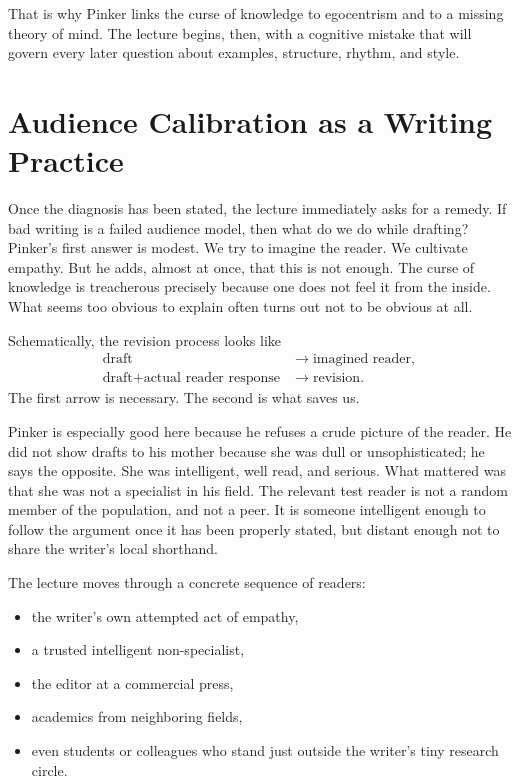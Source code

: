That is why Pinker links the curse of knowledge to egocentrism and to a missing theory of mind. The lecture begins, then, with a cognitive mistake that will govern every later question about examples, structure, rhythm, and style.

\section{Audience Calibration as a Writing Practice}

Once the diagnosis has been stated, the lecture immediately asks for a remedy. If bad writing is a failed audience model, then what do we do while drafting? Pinker's first answer is modest. We try to imagine the reader. We cultivate empathy. But he adds, almost at once, that this is not enough. The curse of knowledge is treacherous precisely because one does not feel it from the inside. What seems too obvious to explain often turns out not to be obvious at all.

Schematically, the revision process looks like
\begin{align}
\text{draft} &\to \text{imagined reader}, \\
\text{draft} + \text{actual reader response} &\to \text{revision}.
\end{align}
The first arrow is necessary. The second is what saves us.

Pinker is especially good here because he refuses a crude picture of the reader. He did not show drafts to his mother because she was dull or unsophisticated; he says the opposite. She was intelligent, well read, and serious. What mattered was that she was not a specialist in his field. The relevant test reader is not a random member of the population, and not a peer. It is someone intelligent enough to follow the argument once it has been properly stated, but distant enough not to share the writer's local shorthand.

The lecture moves through a concrete sequence of readers:
\begin{itemize}
\item the writer's own attempted act of empathy,
\item a trusted intelligent non-specialist,
\item the editor at a commercial press,
\item academics from neighboring fields,
\item even students or colleagues who stand just outside the writer's tiny research circle.
\end{itemize}

